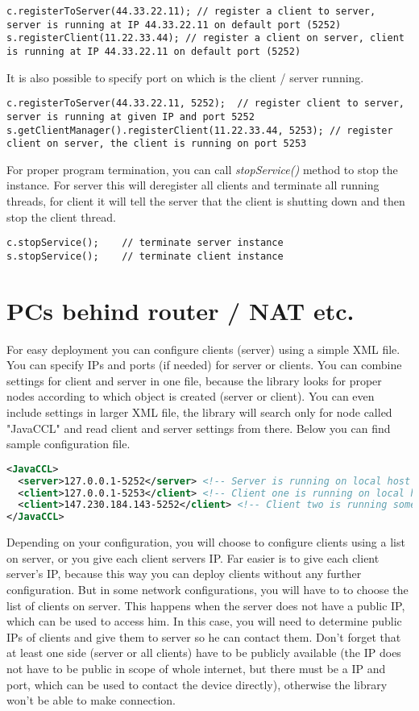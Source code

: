 \documentclass[a4paper,12pt]{article}
\begin{document}
\begin{lstlisting}
c.registerToServer(44.33.22.11); // register a client to server, server is running at IP 44.33.22.11 on default port (5252)
s.registerClient(11.22.33.44); // register a client on server, client is running at IP 44.33.22.11 on default port (5252)
\end{lstlisting}
It is also possible to specify port on which is the client / server running.
\begin{lstlisting}
c.registerToServer(44.33.22.11, 5252);	// register client to server, server is running at given IP and port 5252
s.getClientManager().registerClient(11.22.33.44, 5253); // register client on server, the client is running on port 5253
\end{lstlisting}
For proper program termination, you can call \textit{stopService()} method to stop the instance. For server this will deregister all clients and terminate all running threads, for client it will tell the server that the client is shutting down and then stop the client thread.
\begin{lstlisting}
c.stopService();	// terminate server instance
s.stopService();	// terminate client instance
\end{lstlisting}
\clearpage
\section{PCs behind router / NAT etc.}
For easy deployment you can configure clients (server) using a simple XML file. You can specify IPs and ports (if needed) for server or clients. You can combine settings for client and server in one file, because the library looks for proper nodes according to which object is created (server or client). You can even include settings in larger XML file, the library will search only for node called "JavaCCL" and read client and server settings from there. Below you can find sample configuration file.
\begin{lstlisting}[language=XML, style=listXML, morekeywords={settings, server, client}]
<JavaCCL>
  <server>127.0.0.1-5252</server> <!-- Server is running on local host on port 5252 -->
  <client>127.0.0.1-5253</client> <!-- Client one is running on local host on port 5253 -->
  <client>147.230.184.143-5252</client> <!-- Client two is running somewhere else on port 5252-->
</JavaCCL>
\end{lstlisting}
Depending on your configuration, you will choose to configure clients using a list on server, or you give each client servers IP. Far easier is to give each client server's IP, because this way you can deploy clients without any further configuration. But in some network configurations, you will have to to choose the list of clients on server. This happens when the server does not have a public IP, which can be used to access him. In this case, you will need to determine public IPs of clients and give them to server so he can contact them. Don't forget that at least one side (server or all clients) have to be publicly available (the IP does not have to be public in scope of whole internet, but there must be a IP and port, which can be used to contact the device directly), otherwise the library won't be able to make connection.
\clearpage
\end{document}
